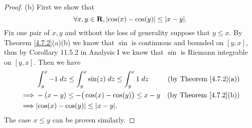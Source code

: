 \begin{proof}{(b)}
    First we show that
    \[
        \forall x, y \in \mathbf{R}, \abs*{\cos(x) - \cos(y)} \leq \abs*{x - y}.
    \]
    Fix one pair of \(x, y\) and without the loss of generality suppose that \(y \leq x\).
    By Theorem \ref{4.7.2}(a)(b) we know that \(\sin\) is continuous and bounded on \([y, x]\), thus by Corollary 11.5.2 in Analysis I we know that \(\sin\) is Riemann integrable on \([y, x]\).
    Then we have
    \begin{align*}
                 & \int_y^x -1 \; dz \leq \int_y^x \sin(z) \; dz \leq \int_y^x 1 \; dz & \text{(by Theorem \ref{4.7.2}(a))} \\
        \implies & -(x - y) \leq -\big(\cos(x) - \cos(y)\big) \leq x - y               & \text{(by Theorem \ref{4.7.2}(b))} \\
        \implies & \abs*{\cos(x) - \cos(y)} \leq \abs*{x - y}.
    \end{align*}
    The case \(x \leq y\) can be proven similarly.


\end{proof}
